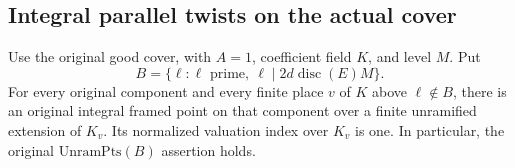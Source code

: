 \subsection{Integral parallel twists on the actual cover}
\label{sec:actual-integral-parallel-twists}

\begin{proposition}\label{prop:actual-unramified-frames}
Use the original good cover, with $A=1$, coefficient field $K$,
and level $M$.  Put
\[
       B=\{\ell:\ell\text{ prime},\ \ell\mid
                                  2d\operatorname{disc}(E)M\}.
\]
For every original component and every finite place $v$ of $K$
above $\ell\notin B$, there is an original integral framed point
on that component over a finite unramified extension of $K_v$.
Its normalized valuation index over $K_v$ is one.  In particular,
the original $\mathrm{UnramPts}(B)$ assertion holds.
\end{proposition}

